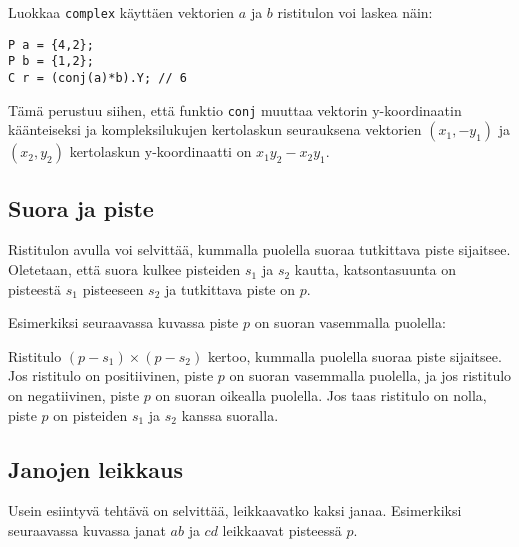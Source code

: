 \noindent
Luokkaa \texttt{complex} käyttäen vektorien
$a$ ja $b$ ristitulon voi laskea näin:

\begin{lstlisting}
P a = {4,2};
P b = {1,2};
C r = (conj(a)*b).Y; // 6
\end{lstlisting}

Tämä perustuu siihen, että funktio \texttt{conj}
muuttaa vektorin y-koordinaatin käänteiseksi
ja kompleksilukujen kertolaskun seurauksena
vektorien $(x_1,-y_1)$ ja $(x_2,y_2)$
kertolaskun y-koordinaatti on $x_1 y_2 - x_2 y_1$.

\subsection{Suora ja piste}

Ristitulon avulla voi selvittää,
kummalla puolella suoraa tutkittava piste sijaitsee.
Oletetaan, että suora kulkee pisteiden
$s_1$ ja $s_2$ kautta, katsontasuunta on
pisteestä $s_1$ pisteeseen $s_2$ ja
tutkittava piste on $p$.

Esimerkiksi seuraavassa kuvassa piste $p$
on suoran vasemmalla puolella:
\\
\begin{center}
\end{center}

Ristitulo $(p-s_1) \times (p-s_2)$
kertoo, kummalla puolella suoraa piste sijaitsee.
Jos ristitulo on positiivinen,
piste $p$ on suoran vasemmalla puolella,
ja jos ristitulo on negatiivinen,
piste $p$ on suoran oikealla puolella.
Jos taas ristitulo on nolla,
piste $p$ on pisteiden $s_1$ ja $s_2$
kanssa suoralla.

\subsection{Janojen leikkaus}

Usein esiintyvä tehtävä on selvittää,
leikkaavatko kaksi janaa.
Esimerkiksi seuraavassa kuvassa
janat $ab$ ja $cd$ leikkaavat pisteessä $p$.
\\
\begin{center}
\end{center}

